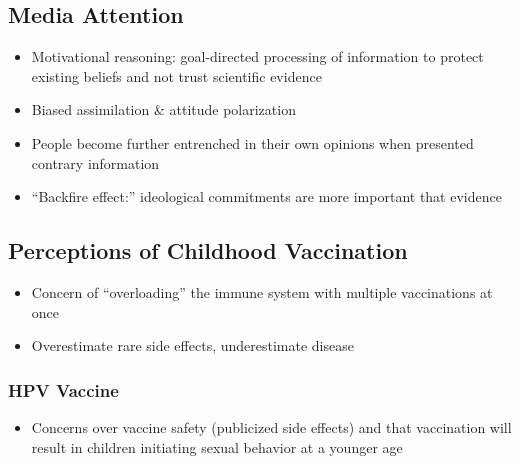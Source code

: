 \documentclass[12pt,]{article}
\providecommand{\tightlist}{%
  \setlength{\itemsep}{0pt}\setlength{\parskip}{0pt}}
\begin{document}
\hypertarget{media-attention}{%
\subsection{Media Attention}\label{media-attention}}

\begin{itemize}
\tightlist
\item
  Motivational reasoning: goal-directed processing of information to protect existing beliefs \autocite{kunda1990:motivated} and not trust scientific evidence \autocite{kraft2015:motivatedscience}
\item
  Biased assimilation \& attitude polarization \autocite{lord1979:biased}
\item
  People become further entrenched in their own opinions when presented contrary information \autocite{nyhan2010:corrections}
\item
  ``Backfire effect:'' ideological commitments are more important that evidence \autocite{wood2016:backfire}
\end{itemize}

\hypertarget{perceptions-of-childhood-vaccination}{%
\subsection{Perceptions of Childhood Vaccination}\label{perceptions-of-childhood-vaccination}}

\begin{itemize}
\tightlist
\item
  Concern of ``overloading'' the immune system with multiple vaccinations at once \autocite{hilton2006:combinedvax}
\item
  Overestimate rare side effects, underestimate disease \autocite{macdonald2012:vaxrisk}
\end{itemize}

\hypertarget{hpv-vaccine}{%
\subsubsection{HPV Vaccine}\label{hpv-vaccine}}

\begin{itemize}
\tightlist
\item
  Concerns over vaccine safety (publicized side effects) and that vaccination will result in children initiating sexual behavior at a younger age \autocite{zimet2013:hpv}
\end{itemize}
\end{document}
